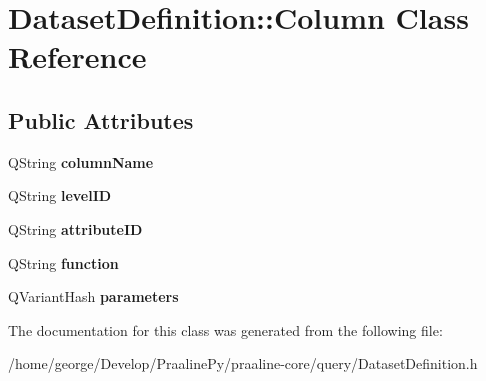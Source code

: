 \hypertarget{class_dataset_definition_1_1_column}{}\section{Dataset\+Definition\+:\+:Column Class Reference}
\label{class_dataset_definition_1_1_column}
\subsection*{Public Attributes}
\begin{DoxyCompactItemize}
\item 
\mbox{\label{class_dataset_definition_1_1_column_a1395f3a329fdbd33609c9c1496363fdf}} 
Q\+String {\bfseries column\+Name}
\item 
\mbox{\label{class_dataset_definition_1_1_column_a949ba1e1f75672a1e2810b3a0907b49a}} 
Q\+String {\bfseries level\+ID}
\item 
\mbox{\label{class_dataset_definition_1_1_column_a86ce9f1b0ea3a4c965f56e437ce870ae}} 
Q\+String {\bfseries attribute\+ID}
\item 
\mbox{\label{class_dataset_definition_1_1_column_a98ba0637498e39bfdf4f6756cbe69a6d}} 
Q\+String {\bfseries function}
\item 
\mbox{\label{class_dataset_definition_1_1_column_a2f3e879db8bb9eb12416a5243c48a490}} 
Q\+Variant\+Hash {\bfseries parameters}
\end{DoxyCompactItemize}


The documentation for this class was generated from the following file\+:\begin{DoxyCompactItemize}
\item 
/home/george/\+Develop/\+Praaline\+Py/praaline-\/core/query/Dataset\+Definition.\+h\end{DoxyCompactItemize}
